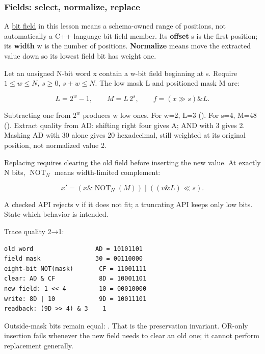\subsubsection{Fields: select, normalize, replace}\label{01-foundations-i-ch001-fields-select-normalize-replace}

\hypertarget{01-foundations-i-ch001-fields-select-normalize-replace}{}

A \hyperref[appendix-ac697f5c66e8]{bit field} in this lesson means a schema-owned range of positions, not automatically a C++ language bit-field member. Its \textbf{offset} s is the first position; its \textbf{width} w is the number of positions. \textbf{Normalize} means move the extracted value down so its lowest field bit has weight one.

Let an unsigned N-bit word x contain a w-bit field beginning at s. Require \(1\le w\le N\), \(s\ge0\), \(s+w\le N\). The low mask L and positioned mask M are:

\[
L=2^w-1,\qquad M=L\,2^s,\qquad f=(x\gg s)\mathbin{\&}L.
\]

Subtracting one from \(2^w\) produces w low ones. For w=2, L=3 (). For s=4, M=48 (). Extract quality from AD: shifting right four gives A; AND with 3 gives 2. Masking AD with 30 alone gives 20 hexadecimal, still weighted at its original position, not normalized value 2.

Replacing requires clearing the old field before inserting the new value. At exactly N bits, \(\operatorname{NOT}_N\) means width-limited complement:

\[
x'=(x\mathbin{\&}\operatorname{NOT}_N(M))
\mathbin{|}((v\mathbin{\&}L)\ll s).
\]

A checked API rejects v if it does not fit; a truncating API keeps only low bits. State which behavior is intended.

Trace quality 2→1:

\begin{verbatim}
old word                 AD = 10101101
field mask               30 = 00110000
eight-bit NOT(mask)       CF = 11001111
clear: AD & CF            8D = 10001101
new field: 1 << 4         10 = 00010000
write: 8D | 10            9D = 10011101
readback: (9D >> 4) & 3    1
\end{verbatim}

Outside-mask bits remain equal: . That is the preservation invariant. OR-only insertion fails whenever the new field needs to clear an old one; it cannot perform replacement generally.

